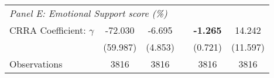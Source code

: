 {\begin{tabular}{l*{5}{c}}
\midrule

 \multicolumn{6}{l}{\textit{Panel E: Emotional Support score (\%)}} \\
CRRA Coefficient: $\gamma$&  -72.030         &     -6.695  &           &   \textbf{-1.265\sym{*}}  &     14.242               \\
                & (59.987)         &       (4.853)          & &  (0.721)         &       (11.597)            \\
\addlinespace
Observations    &     3816         &     3816         & &    3816         &     3816         \\
\bottomrule
\end{tabular}
}
